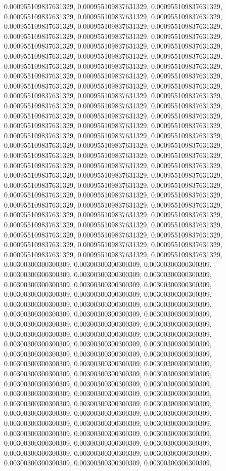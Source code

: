 \documentclass[
  ,man]{apa6}
\begin{document}
0.000955109837631329, 0.000955109837631329, 0.000955109837631329, 0.000955109837631329, 0.000955109837631329, 0.000955109837631329, 0.000955109837631329, 0.000955109837631329, 0.000955109837631329, 0.000955109837631329, 0.000955109837631329, 0.000955109837631329, 0.000955109837631329, 0.000955109837631329, 0.000955109837631329, 0.000955109837631329, 0.000955109837631329, 0.000955109837631329, 0.000955109837631329, 0.000955109837631329, 0.000955109837631329, 0.000955109837631329, 0.000955109837631329,
0.000955109837631329, 0.000955109837631329, 0.000955109837631329, 0.000955109837631329, 0.000955109837631329, 0.000955109837631329, 0.000955109837631329, 0.000955109837631329, 0.000955109837631329, 0.000955109837631329, 0.000955109837631329, 0.000955109837631329, 0.000955109837631329, 0.000955109837631329, 0.000955109837631329, 0.000955109837631329, 0.000955109837631329, 0.000955109837631329, 0.000955109837631329, 0.000955109837631329, 0.000955109837631329, 0.000955109837631329, 0.000955109837631329,
0.000955109837631329, 0.000955109837631329, 0.000955109837631329, 0.000955109837631329, 0.000955109837631329, 0.000955109837631329, 0.000955109837631329, 0.000955109837631329, 0.000955109837631329, 0.000955109837631329, 0.000955109837631329, 0.000955109837631329, 0.000955109837631329, 0.000955109837631329, 0.000955109837631329, 0.000955109837631329, 0.000955109837631329, 0.000955109837631329, 0.000955109837631329, 0.000955109837631329, 0.000955109837631329, 0.000955109837631329, 0.000955109837631329,
0.000955109837631329, 0.000955109837631329, 0.000955109837631329, 0.000955109837631329, 0.000955109837631329, 0.000955109837631329, 0.000955109837631329, 0.000955109837631329, 0.000955109837631329, 0.00300300300300309, 0.00300300300300309, 0.00300300300300309, 0.00300300300300309, 0.00300300300300309, 0.00300300300300309, 0.00300300300300309, 0.00300300300300309, 0.00300300300300309, 0.00300300300300309, 0.00300300300300309, 0.00300300300300309, 0.00300300300300309, 0.00300300300300309, 0.00300300300300309,
0.00300300300300309, 0.00300300300300309, 0.00300300300300309, 0.00300300300300309, 0.00300300300300309, 0.00300300300300309, 0.00300300300300309, 0.00300300300300309, 0.00300300300300309, 0.00300300300300309, 0.00300300300300309, 0.00300300300300309, 0.00300300300300309, 0.00300300300300309, 0.00300300300300309, 0.00300300300300309, 0.00300300300300309, 0.00300300300300309, 0.00300300300300309, 0.00300300300300309, 0.00300300300300309, 0.00300300300300309, 0.00300300300300309, 0.00300300300300309,
0.00300300300300309, 0.00300300300300309, 0.00300300300300309, 0.00300300300300309, 0.00300300300300309, 0.00300300300300309, 0.00300300300300309, 0.00300300300300309, 0.00300300300300309, 0.00300300300300309, 0.00300300300300309, 0.00300300300300309, 0.00300300300300309, 0.00300300300300309, 0.00300300300300309, 0.00300300300300309, 0.00300300300300309, 0.00300300300300309, 0.00300300300300309, 0.00300300300300309, 0.00300300300300309, 0.00300300300300309, 0.00300300300300309, 0.00300300300300309,
\end{document}

